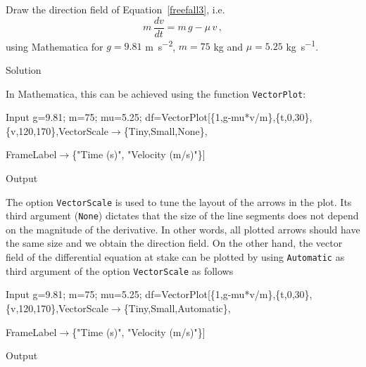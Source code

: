 \begin{example}
\ifmathematica
\label{exDF}
Draw the direction field of Equation~\eqref{freefall3}, i.e.
$$
m\,\dfrac{d v}{d t}=m\,g-\mu\,v\,,
$$
using Mathematica for $g=9.81$ \si{m.s^{-2}}, $m=75$ \si{kg} and $\mu=5.25$ \si{kg.s^{-1}}.

Solution 

In Mathematica, this can be achieved using the function \lstinline{VectorPlot}:
\begin{mdframed}[default,backgroundcolor=gray!40,roundcorner=8pt]
\begin{mmaCell}[morefunctionlocal={v, t},moredefined={VectorScale,Tiny,Small}]{Input}
	 g=9.81;
	 m=75;
	 mu=5.25;
	 df=VectorPlot[\{1,g-mu*v/m\},\{t,0,30\},\{v,120,170\},VectorScale\(\pmb{\to}\)\{Tiny,Small,None\},
	
	 FrameLabel\(\pmb{\to}\)\{"Time (s)", "Velocity (m/s)"\}]

\end{mmaCell}

\begin{mmaCell}[moregraphics={moreig={scale=.4}}]{Output}
\end{mmaCell}
\end{mdframed}
The option \lstinline{VectorScale} is used to tune the layout of the arrows in the plot. Its third argument (\lstinline{None}) dictates that the size of the line segments does not depend on the magnitude of the derivative. In other words, all plotted arrows should have the same size and we obtain the direction field. On the other hand, the vector field of the differential equation at stake can be plotted by using \lstinline{Automatic} as third argument of the option \lstinline{VectorScale} as follows

\begin{mdframed}[default,backgroundcolor=gray!40,roundcorner=8pt]
\begin{mmaCell}[morefunctionlocal={v, t},moredefined={VectorScale,Tiny,Small}]{Input}
	 g=9.81;
	 m=75;
	 mu=5.25;
	 df=VectorPlot[\{1,g-mu*v/m\},\{t,0,30\},\{v,120,170\},VectorScale\(\pmb{\to}\)\{Tiny,Small,Automatic\},
	
	 FrameLabel\(\pmb{\to}\)\{"Time (s)", "Velocity (m/s)"\}]

\end{mmaCell}

\begin{mmaCell}[moregraphics={moreig={scale=.4}}]{Output}
\end{mmaCell}
\end{mdframed}


\end{example}
